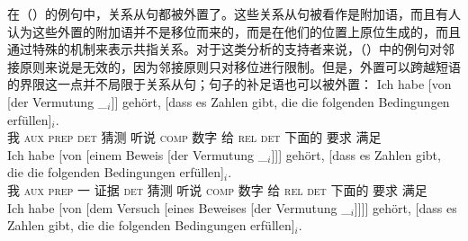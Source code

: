 在（）的例句中，关系从句都被外置了。这些关系从句被看作是附加语，而且有人认为这些外置的附加语并不是移位而来的，而是在他们的位置上原位生成的，而且通过特殊的机制来表示共指关系\citep{Kiss2005a}。对于这类分析的支持者来说，（）中的例句对邻接原则来说是无效的，因为邻接原则只对移位进行限制。但是，外置可以跨越短语的界限这一点并不局限于关系从句；句子的补足语也可以被外置：
\eal
\ex 
\gll Ich habe       [von                    [der                    Vermutung \_$_i$]] gehört, [dass es Zahlen gibt, die die folgenden Bedingungen erfüllen]$_i$.\\
     我 \textsc{aux} \spacebr{}\textsc{prep} \spacebr{}\textsc{det} 猜测 {} 听说 \spacebr{}\textsc{comp} \expl{} 数字 给 \textsc{rel} \textsc{det} 下面的 要求 满足\\
\ex 
\gll Ich habe [von [einem Beweis [der Vermutung \_$_i$]]] gehört, [dass es Zahlen gibt, die die folgenden Bedingungen erfüllen]$_i$.\\
	我 \textsc{aux} \spacebr{}\textsc{prep} \spacebr{}一 证据 \spacebr{}\textsc{det} 猜测 {} 听说 \spacebr{}\textsc{comp} \expl{} 数字 给 \textsc{rel} \textsc{det} 下面的 要求 满足\\
\ex 
\gll Ich habe [von [dem Versuch [eines Beweises [der Vermutung \_$_i$]]]] gehört, [dass es Zahlen gibt, die die folgenden Bedingungen erfüllen]$_i$.\\
